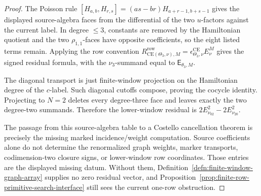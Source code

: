 \begin{proof}
  The Poisson rule
  \([H_{a,b},H_{r,s}]=(as-br)H_{a+r-1,b+s-1}\) gives the displayed
  source-algebra faces from the differential of the two \(u\)-factors
  against the current label.  In degree \(\leq3\), constants are removed by
  the Hamiltonian quotient and the two \(\rho_{1,1}\)-faces have opposite
  coefficients, so the eight listed terms remain.  Applying the row
  convention
  \(R^{\mathrm{row}}_{\mathrm{CE}(\Theta_3,\nu),M}
  =\epsilon^{\mathrm{CE}}_{\Theta_3,\nu}E^M_\nu\) gives the signed residual
  formula, with the \(\nu_3\)-summand equal to
  \(\mathsf E_{\theta_3,M}\).

  The diagonal transport is just finite-window projection on the Hamiltonian
  degree of the \(c\)-label.  Such diagonal cutoffs compose, proving the
  cocycle identity.  Projecting to \(N=2\) deletes every degree-three face
  and leaves exactly the two degree-two summands.  Therefore the lower-window
  residual is \(2E^2_{\nu_{02}}-2E^2_{\nu_{20}}\).

  The passage from this source-algebra table to a Costello cancellation
  theorem is precisely the missing marked incidence/weight computation.
  Source coefficients alone do not determine the renormalized graph weights,
  marker transports, codimension-two closure signs, or lower-window row
  coordinates.  Those entries are the displayed missing datum.  Without
  them, Definition~\ref{defn:finite-window-graph-array} supplies no zero
  residual vector, and Proposition~\ref{prop:finite-row-primitive-search-interface}
  still sees the current one-row obstruction.
\end{proof}

